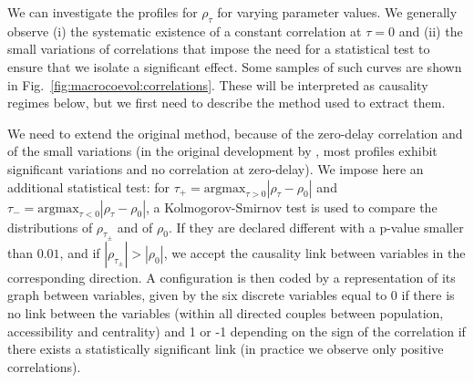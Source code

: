 \documentclass[11pt]{article}
\begin{document}
We can investigate the profiles for $\rho_\tau$ for varying parameter values. We generally observe (i) the systematic existence of a constant correlation at $\tau = 0$ and (ii) the small variations of correlations that impose the need for a statistical test to ensure that we isolate a significant effect. Some samples of such curves are shown in Fig.~\ref{fig:macrocoevol:correlations}. These will be interpreted as causality regimes below, but we first need to describe the method used to extract them.


We need to extend the original method, because of the zero-delay correlation and of the small variations (in the original development by \cite{raimbault2017identification}, most profiles exhibit significant variations and no correlation at zero-delay). We impose here an additional statistical test: for $\tau_+ = \textrm{argmax}_{\tau>0} \left|\rho_{\tau} - \rho_0\right|$ and $\tau_- = \textrm{argmax}_{\tau<0} \left|\rho_{\tau} - \rho_0\right|$, a Kolmogorov-Smirnov test is used to compare the distributions of $\rho_{\tau_{\pm}}$ and of $\rho_0$. If they are declared different with a p-value smaller than $0.01$, and if $\left|\rho_{\tau_{\pm}}\right| > \left|\rho_0\right|$, we accept the causality link between variables in the corresponding direction. A configuration is then coded by a representation of its graph between variables, given by the six discrete variables equal to 0 if there is no link between the variables (within all directed couples between population, accessibility and centrality) and 1 or -1 depending on the sign of the correlation if there exists a statistically significant link (in practice we observe only positive correlations).
\end{document}
